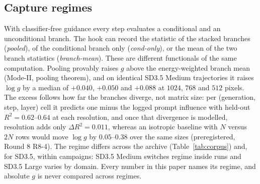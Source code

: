 \documentclass[11pt]{article}
\begin{document}
\subsection{Capture regimes}
With classifier-free guidance \citep{ho2022classifierfree} every step evaluates a conditional and an unconditional branch. The hook can record the statistic of the stacked branches (\emph{pooled}), of the conditional branch only (\emph{cond-only}), or the mean of the two branch statistics (\emph{branch-mean}). These are different functionals of the same computation. Pooling provably raises $g$ above the energy-weighted branch mean (Mode-II, pooling theorem), and on identical SD3.5 Medium trajectories it raises $\log g$ by a median of $+0.040$, $+0.050$ and $+0.088$ at $1024$, $768$ and $512$ pixels. The excess follows how far the branches diverge, not matrix size: per (generation, step, layer) cell it predicts one minus the logged prompt influence with held-out $R^2=0.62$--$0.64$ at each resolution, and once that divergence is modelled, resolution adds only $\Delta R^2=0.011$, whereas an isotropic baseline with $N$ versus $2N$ rows would move $\log g$ by $0.05$--$0.38$ over the same sizes (preregistered, Round 8 R8-4). The regime differs across the archive (Table~\ref{tab:corpus}) and, for SD3.5, within campaigns: SD3.5 Medium switches regime inside runs and SD3.5 Large varies by domain. Every number in this paper names its regime, and absolute $g$ is never compared across regimes.
\end{document}
